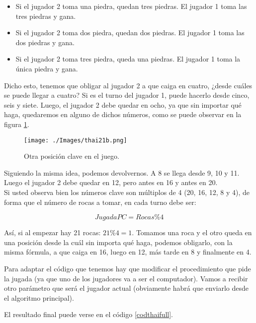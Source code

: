 \begin{itemize}
\item Si el jugador 2 toma una piedra, quedan tres piedras. El jugador 1 toma las tres piedras y gana.
\item Si el jugador 2 toma dos piedra, quedan dos piedras. El jugador 1 toma las dos piedras y gana.
\item Si el jugador 2 toma tres piedra, queda una piedras. El jugador 1 toma la única piedra y gana.
\end{itemize}

Dicho esto, tenemos que obligar al jugador 2 a que caiga en cuatro, ¿desde cuáles se puede llegar a cuatro? Si es el turno del jugador 1, puede hacerlo desde cinco, seis y siete. Luego, el jugador 2 debe quedar en ocho, ya que sin importar qué haga, quedaremos en alguno de dichos números, como se puede observar en la figura \ref{figthaiB}. 


\begin{figure}[h!]
	\centering
	\texttt{[image: ./Images/thai21b.png]}	
	\caption{Otra posición clave en el juego.}
	\label{figthaiB}	
\end{figure}

Siguiendo la misma idea, podemos devolvernos. A 8 se llega desde 9, 10 y 11. Luego el jugador 2 debe quedar en 12, pero antes en 16 y antes en 20. \\

Si usted observa bien los números clave son múltiplos de 4 (20, 16, 12, 8 y 4), de forma que el número de rocas a tomar, en cada turno debe ser:

\begin{equation}
JugadaPC = Rocas \% 4
\end{equation}

Así, si al empezar hay 21 rocas: $21\%4=1$. Tomamos una roca y el otro queda en una posición desde la cuál sin importa qué haga, podemos obligarlo, con la misma fórmula, a que caiga en 16, luego en 12, más tarde en 8 y finalmente en 4.

Para adaptar el código que tenemos hay que modificar el procedimiento que pide la jugada (ya que uno de los jugadores va a ser el computador). Vamos a recibir otro parámetro que será el jugador actual (obviamente habrá que enviarlo desde el algoritmo principal).

El resultado final puede verse en el código \ref{codthaifull}.
\newpage

\newpage

